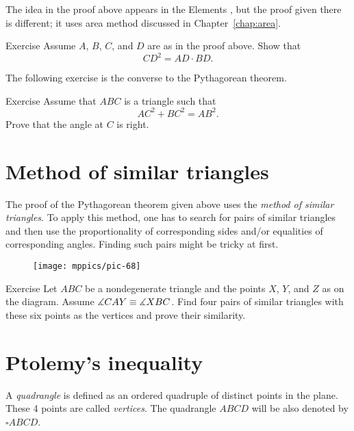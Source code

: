 The idea in the proof above appears in the Elements \cite[X.33]{euclid},
but the proof given there \cite[I.47]{euclid} is different; 
it uses area method discussed in Chapter~\ref{chap:area}.


\begin{thm}{Exercise}\label{ex:pyth}
Assume $A$, $B$, $C$, and $D$ are as in the proof above.
Show that 
$$CD^2=AD\cdot BD.$$

\end{thm}

The following exercise is the converse to the Pythagorean theorem.

\begin{thm}{Exercise}\label{ex:pyth-conv}
Assume that $ABC$ is a triangle such that
$$AC^2+BC^2=AB^2.$$ 
Prove that the angle at $C$ is right.
\end{thm}


\section{Method of similar triangles}

The proof of the Pythagorean theorem given above uses the \emph{method of similar triangles}.
To apply this method, one has to search for pairs of similar triangles and then use the proportionality of corresponding sides and/or equalities of corresponding angles.
Finding such pairs might be tricky at first. 

{

\begin{wrapfigure}{r}{25mm}
\vskip-6mm
\centering
\texttt{[image: mppics/pic-68]}
\end{wrapfigure}


\begin{thm}{Exercise}\label{ex:two-pairs-sim}
Let $ABC$ be a nondegenerate triangle and the points $X$, $Y$, and $Z$ as on the diagram.
Assume $\measuredangle CAY\z\equiv\measuredangle XBC$.
Find four pairs of similar triangles with these six points as the vertices
and prove their similarity.
\end{thm}

}

\section{Ptolemy's inequality}

A \emph{quadrangle} is defined as an ordered quadruple of distinct points in the plane.
These 4 points are called \emph{vertices}.
The quadrangle $ABCD$ will be also denoted by $\square ABCD$.

